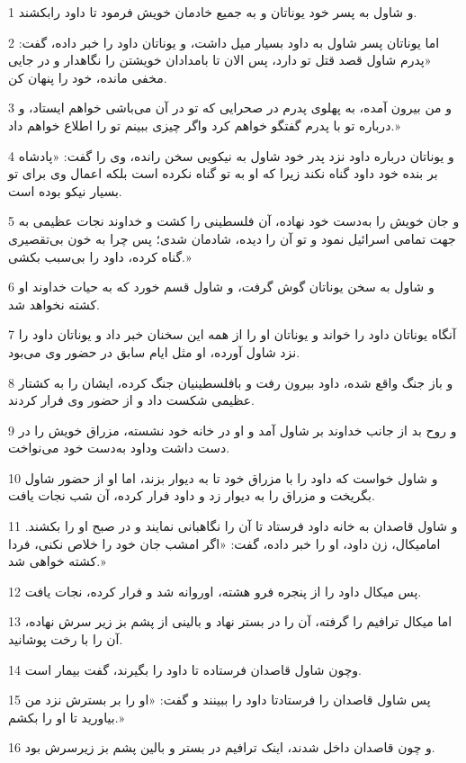 \par 1 و شاول به پسر خود یوناتان و به جمیع خادمان خویش فرمود تا داود رابکشند.
\par 2 اما یوناتان پسر شاول به داود بسیار میل داشت، و یوناتان داود را خبر داده، گفت: «پدرم شاول قصد قتل تو دارد، پس الان تا بامدادان خویشتن را نگاهدار و در جایی مخفی مانده، خود را پنهان کن.
\par 3 و من بیرون آمده، به پهلوی پدرم در صحرایی که تو در آن می‌باشی خواهم ایستاد، و درباره تو با پدرم گفتگو خواهم کرد واگر چیزی ببینم تو را اطلاع خواهم داد.»
\par 4 و یوناتان درباره داود نزد پدر خود شاول به نیکویی سخن رانده، وی را گفت: «پادشاه بر بنده خود داود گناه نکند زیرا که او به تو گناه نکرده است بلکه اعمال وی برای تو بسیار نیکو بوده است.
\par 5 و جان خویش را به‌دست خود نهاده، آن فلسطینی را کشت و خداوند نجات عظیمی به جهت تمامی اسرائیل نمود و تو آن را دیده، شادمان شدی؛ پس چرا به خون بی‌تقصیری گناه کرده، داود را بی‌سبب بکشی.»
\par 6 و شاول به سخن یوناتان گوش گرفت، و شاول قسم خورد که به حیات خداوند او کشته نخواهد شد.
\par 7 آنگاه یوناتان داود را خواند و یوناتان او را از همه این سخنان خبر داد و یوناتان داود را نزد شاول آورده، او مثل ایام سابق در حضور وی می‌بود.
\par 8 و باز جنگ واقع شده، داود بیرون رفت و بافلسطینیان جنگ کرده، ایشان را به کشتار عظیمی شکست داد و از حضور وی فرار کردند.
\par 9 و روح بد از جانب خداوند بر شاول آمد و او در خانه خود نشسته، مزراق خویش را در دست داشت وداود به‌دست خود می‌نواخت.
\par 10 و شاول خواست که داود را با مزراق خود تا به دیوار بزند، اما او از حضور شاول بگریخت و مزراق را به دیوار زد و داود فرار کرده، آن شب نجات یافت.
\par 11 و شاول قاصدان به خانه داود فرستاد تا آن را نگاهبانی نمایند و در صبح او را بکشند. امامیکال، زن داود، او را خبر داده، گفت: «اگر امشب جان خود را خلاص نکنی، فردا کشته خواهی شد.»
\par 12 پس میکال داود را از پنجره فرو هشته، اوروانه شد و فرار کرده، نجات یافت.
\par 13 اما میکال ترافیم را گرفته، آن را در بستر نهاد و بالینی از پشم بز زیر سرش نهاده، آن را با رخت پوشانید.
\par 14 وچون شاول قاصدان فرستاده تا داود را بگیرند، گفت بیمار است.
\par 15 پس شاول قاصدان را فرستادتا داود را ببینند و گفت: «او را بر بسترش نزد من بیاورید تا او را بکشم.»
\par 16 و چون قاصدان داخل شدند، اینک ترافیم در بستر و بالین پشم بز زیرسرش بود.
